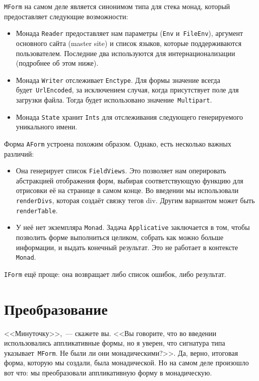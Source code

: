 \lstinline'MForm' на самом деле является синонимом типа для стека монад,
который предоставляет следующие возможности:
\begin{itemize}
    \item Монада \lstinline'Reader' предоставляет нам параметры
        (\lstinline'Env' и~\lstinline'FileEnv'), аргумент основного сайта
        (master site) и список языков, которые поддерживаются пользователем.
        Последние два используются для интернационализации (подробнее об этом
        ниже).

    \item Монада \lstinline'Writer' отслеживает \lstinline'Enctype'. Для формы
        значение всегда будет~\lstinline'UrlEncoded', за исключением случая,
        когда присутствует поле для загрузки файла. Тогда будет использовано
        значение~\lstinline'Multipart'.

    \item Монада \lstinline'State' хранит \lstinline'Ints' для отслеживания
        следующего генерируемого уникального имени.
\end{itemize}

Форма \lstinline'AForm' устроена похожим образом. Однако, есть несколько важных различий:
\begin{itemize}
    \item Она генерирует список \lstinline'FieldViews'. Это позволяет нам
        оперировать абстракцией отображения форм, выбирая соответствующую
        функцию для отрисовки её на странице в самом конце. Во введении мы
        использовали \lstinline'renderDivs', которая создаёт связку тегов div.
        Другим вариантом может быть \lstinline'renderTable'.

    \item У неё нет экземпляра \lstinline'Monad'. Задача
        \lstinline'Applicative' заключается в том, чтобы позволить форме
        выполниться целиком, собрать как можно больше информации, и выдать
        конечный результат. Это не работает в контексте \lstinline'Monad'.
\end{itemize}

\lstinline'IForm' ещё проще: она возвращает либо список ошибок, либо результат.

\section{Преобразование}
<<Минуточку>>,~--- скажете вы. <<Вы говорите, что во введении использовались
аппликативные формы, но я уверен, что сигнатура типа
указывает~\lstinline'MForm'. Не были ли они монадическими?>>. Да, верно,
итоговая форма, которую мы создали, была монадической. Но на самом деле
произошло вот что: мы преобразовали аппликативную форму в монадическую.

